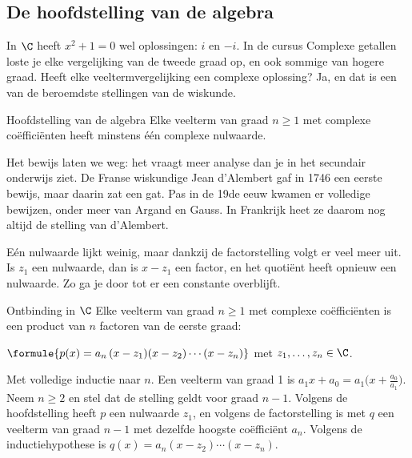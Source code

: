 \subsection{De hoofdstelling van de algebra}

In $\C$ heeft $x^2 + 1 = 0$ wel oplossingen: $i$ en $-i$. In de cursus Complexe getallen loste je elke vergelijking van de tweede graad op, en ook sommige van hogere graad. Heeft elke veeltermvergelijking een complexe oplossing? Ja, en dat is een van de beroemdste stellingen van de wiskunde.

\begin{theorie}
\begin{stelling}{Hoofdstelling van de algebra}
Elke veelterm van graad $n \geqslant 1$ met complexe coëfficiënten heeft minstens één complexe nulwaarde.
\end{stelling}
\end{theorie}

Het bewijs laten we weg: het vraagt meer analyse dan je in het secundair onderwijs ziet. De Franse wiskundige Jean d'Alembert gaf in 1746 een eerste bewijs, maar daarin zat een gat. Pas in de 19de eeuw kwamen er volledige bewijzen, onder meer van Argand en Gauss. In Frankrijk heet ze daarom nog altijd de stelling van d'Alembert.

Eén nulwaarde lijkt weinig, maar dankzij de factorstelling volgt er veel meer uit. Is $z_1$ een nulwaarde, dan is $x - z_1$ een factor, en het quotiënt heeft opnieuw een nulwaarde. Zo ga je door tot er een constante overblijft.

\begin{theorie}
\begin{stelling}{Ontbinding in $\C$}
Elke veelterm van graad $n \geqslant 1$ met complexe coëfficiënten is een product van $n$ factoren van de eerste graad:

\vspace{1mm}
\qquad $\formule{p(x) = a_n\,(x - z_1)(x - z_2)\cdots(x - z_n)}$ \quad met $z_1, \ldots, z_n \in \C$.
\end{stelling}

\begin{bewijs}
Met volledige inductie naar $n$. Een veelterm van graad 1 is $a_1 x + a_0 = a_1\bigl(x + \tfrac{a_0}{a_1}\bigr)$. Neem $n \geqslant 2$ en stel dat de stelling geldt voor graad $n - 1$. Volgens de hoofdstelling heeft $p$ een nulwaarde $z_1$, en volgens de factorstelling is
met $q$ een veelterm van graad $n - 1$ met dezelfde hoogste coëfficiënt $a_n$. Volgens de inductiehypothese is $q(x) = a_n(x - z_2)\cdots(x - z_n)$.
\end{bewijs}
\end{theorie}

